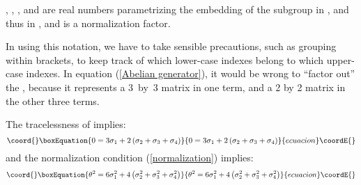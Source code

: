 \documentclass[a4paper,12pt,oneside]{article}
\begin{document}
\coordHE{}, \coordHE{}, \coordHE{}, and \coordHE{} are real numbers
parametrizing the embedding of the \coordHE{} subgroup in
\coordHE{}, and thus in \coordHE{}, and \myHighlight{$\theta$}\coordHE{} is a
normalization factor.

In using this notation, we have to take sensible precautions, such
as grouping within brackets, to keep track of which lower-case 
indexes belong to which upper-case indexes.  In equation
(\ref{Abelian generator}), it would be wrong to ``factor out'' the
\coordHE{}, because it represents a \mbox{3 by 3} matrix in one
term, and a 2 by 2 matrix in the other three terms.

The tracelessness of \coordHE{} implies:
\begin{equation}\coord{}\boxEquation{\label{tracelessness}
0 = 3\sigma_1+2\left(\sigma_2+\sigma_3+\sigma_4\right)
}{0 = 3\sigma_1+2\left(\sigma_2+\sigma_3+\sigma_4\right)
}{ecuacion}\coordE{}\end{equation}
and the normalization condition (\ref{normalization}) implies:
\begin{equation}\coord{}\boxEquation{\label{theta squared}
\theta^2 = 
6\sigma_1^2+4\left(\sigma_2^2+\sigma_3^2+\sigma_4^2\right)
}{\theta^2 = 
6\sigma_1^2+4\left(\sigma_2^2+\sigma_3^2+\sigma_4^2\right)
}{ecuacion}\coordE{}\end{equation}
\end{document}

